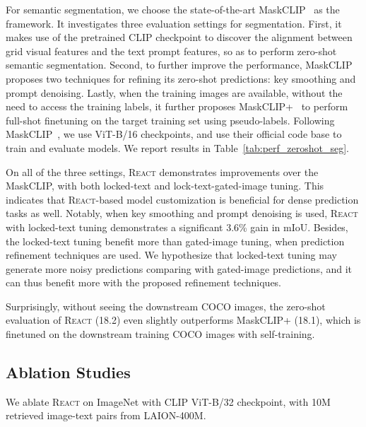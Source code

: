 \documentclass[10pt,twocolumn,letterpaper]{article}
\newcommand{\shortname}{\textsc{React}}
\begin{document}
For semantic segmentation, we choose the state-of-the-art MaskCLIP~\cite{zhou2022maskclip} as the framework. It investigates three evaluation settings for segmentation. First, it makes use of the pretrained CLIP checkpoint to discover the alignment between grid visual features and the text prompt features, so as to perform zero-shot semantic segmentation.
Second, to further improve the performance, MaskCLIP~\cite{zhou2022maskclip} proposes two techniques for refining its zero-shot predictions: key smoothing and prompt denoising. 
Lastly, when the training images are available, without the need to access the training labels, it further proposes MaskCLIP+~\cite{zhou2022maskclip} to perform full-shot finetuning on the target training set using pseudo-labels.
Following MaskCLIP~\cite{zhou2022maskclip}, we use ViT-B/16 checkpoints, and use their official code base to train and evaluate models.  We report results in Table~\ref{tab:perf_zeroshot_seg}.

On all of the three settings, \shortname{} demonstrates improvements over the MaskCLIP, with both locked-text and lock-text-gated-image tuning.  This indicates that \shortname{}-based model customization is beneficial for dense prediction tasks as well.  Notably, when key smoothing and prompt denoising is used, \shortname{} with locked-text tuning demonstrates a significant 3.6\% gain in mIoU.
Besides, the locked-text tuning benefit more than gated-image tuning, when prediction refinement techniques are used.  We hypothesize that locked-text tuning may generate more noisy predictions comparing with gated-image predictions, and it can thus benefit more with the proposed refinement techniques.

Surprisingly, without seeing the downstream COCO images, the zero-shot evaluation of \shortname{} (18.2) even slightly outperforms MaskCLIP+ (18.1), which is finetuned on the downstream training COCO images with self-training.


\subsection{Ablation Studies}

\label{sec:ablation}

We ablate \shortname{} on ImageNet with CLIP ViT-B/32 checkpoint, with 10M retrieved image-text pairs from LAION-400M.
\end{document}

